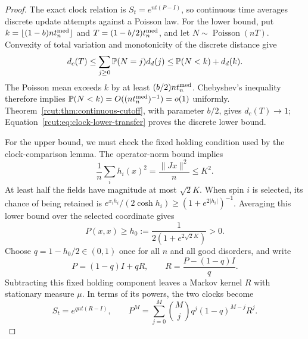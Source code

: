 \begin{proof}
The exact clock relation is $S_t=e^{nt(P-I)}$, so continuous time
averages discrete update attempts against a Poisson law.  For the
lower bound, put
$k=\lfloor(1-b)nt_n^{\rm med}\rfloor$ and $T=(1-b/2)t_n^{\rm med}$, and let
$N\sim\operatorname{Poisson}(nT)$.  Convexity of total variation and
monotonicity of the discrete distance give
\begin{equation}
 d_c(T)\le\sum_{j\ge0}\P(N=j)d_d(j)
                \le\P(N<k)+d_d(k).
 \label{rcut:eq:clock-lower-transfer}
\end{equation}
The Poisson mean exceeds $k$ by at least $(b/2)nt_n^{\rm med}$.
Chebyshev's inequality therefore implies $\P(N<k)=O((nt_n^{\rm med})^{-1})=o(1)$ uniformly.
Theorem~\ref{rcut:thm:continuous-cutoff}, with parameter $b/2$, gives
$d_c(T)\to1$; Equation~\eqref{rcut:eq:clock-lower-transfer} proves the
discrete lower bound.

For the upper bound, we must check the fixed holding condition used
by the clock-comparison lemma.  The operator-norm bound implies
\[
 \frac1n\sum_i h_i(x)^2=\frac{\|Jx\|^2}{n}\le K^2.
\]
At least half the fields have magnitude at most $\sqrt2K$.  When spin
$i$ is selected, its chance of being retained is
$e^{x_ih_i}/(2\cosh h_i)\ge(1+e^{2|h_i|})^{-1}$.
Averaging this lower bound over the selected coordinate gives
\begin{equation}
 P(x,x)\ge h_0:=\frac{1}{2(1+e^{2\sqrt2K})}>0.
 \label{rcut:eq:clock-uniform-holding}
\end{equation}
Choose $q=1-h_0/2\in(0,1)$ once for all $n$ and all good
disorders, and write
\[
 P=(1-q)I+q R,
 \qquad R=\frac{P-(1-q)I}{q}.
\]
Subtracting this fixed holding component leaves a Markov kernel
$R$ with stationary measure $\mu$.  In terms of its powers, the two
clocks become
\begin{equation}
 S_t=e^{q nt(R-I)},\qquad
 P^M=\sum_{j=0}^M\binom Mjq^j(1-q)^{M-j}R^j.
 \label{rcut:eq:clock-thinning}
\end{equation}


\end{proof}
